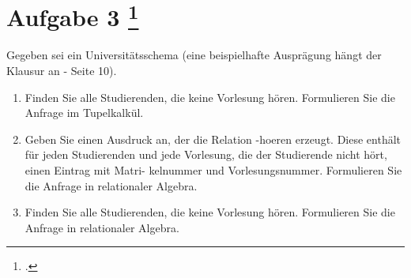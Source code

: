 \documentclass{lehramt-informatik-aufgabe}
\begin{document}
\section{Aufgabe 3
\footcite{66116:2020:03}}

Gegeben sei ein Universitätsschema (eine beispielhafte Ausprägung hängt
der Klausur an - Seite 10).

\begin{enumerate}


\item Finden Sie alle Studierenden, die keine Vorlesung hören.
Formulieren Sie die Anfrage im Tupelkalkül.


\item Geben Sie einen Ausdruck an, der die Relation -hoeren erzeugt.
Diese enthält für jeden Studierenden und jede Vorlesung, die der
Studierende nicht hört, einen Eintrag mit Matri- kelnummer und
Vorlesungsnummer. Formulieren Sie die Anfrage in relationaler Algebra.


\item Finden Sie alle Studierenden, die keine Vorlesung hören.
Formulieren Sie die Anfrage in relationaler Algebra.
\end{enumerate}
\end{document}
